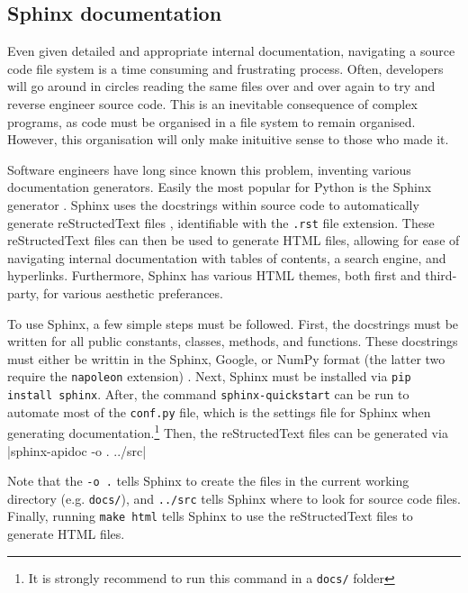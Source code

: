 \documentclass[11pt]{article}
\begin{document}
\inputminted[linenos=true]{python}{python_examples/docstring.py}

\subsection{Sphinx documentation}

Even given detailed and appropriate internal documentation, navigating a source code file system is a time consuming and frustrating process. Often, developers will go around in circles reading the same files over and over again to try and reverse engineer source code. This is an inevitable consequence of complex programs, as code must be organised in a file system to remain organised. However, this organisation will only make inituitive sense to those who made it.

Software engineers have long since known this problem, inventing various documentation generators. Easily the most popular for Python is the Sphinx generator \cite{sphinx}. Sphinx uses the docstrings within source code to automatically generate reStructedText files \cite{rst}, identifiable with the \texttt{.rst} file extension. These reStructedText files can then be used to generate HTML files, allowing for ease of navigating internal documentation with tables of contents, a search engine, and hyperlinks. Furthermore, Sphinx has various HTML themes, both first and third-party, for various aesthetic preferances.

To use Sphinx, a few simple steps must be followed. First, the docstrings must be written for all public constants, classes, methods, and functions. These docstrings must either be writtin in the Sphinx, Google, or NumPy format (the latter two require the \texttt{napoleon} extension) \cite{sphinx-napolean}. Next, Sphinx must be installed via \texttt{pip install sphinx}. After, the command \texttt{sphinx-quickstart} can be run to automate most of the \texttt{conf.py} file, which is the settings file for Sphinx when generating documentation.\footnote{It is strongly recommend to run this command in a \texttt{docs/} folder} Then, the reStructedText files can be generated via
|sphinx-apidoc -o . ../src|

\noindent
Note that the \texttt{-o .} tells Sphinx to create the files in the current working directory (e.g. \texttt{docs/}), and \texttt{../src} tells Sphinx where to look for source code files. Finally, running \texttt{make html} tells Sphinx to use the reStructedText files to generate HTML files.
\end{document}
